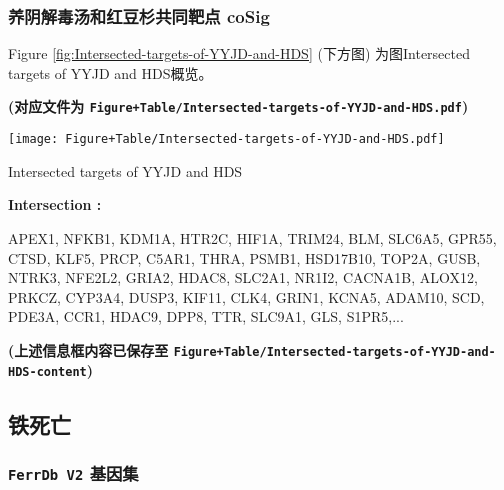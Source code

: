 \documentclass[
]{article}
\begin{document}
\hypertarget{ux517bux9634ux89e3ux6bd2ux6c64ux548cux7ea2ux8c46ux6749ux5171ux540cux9776ux70b9-cosig}{%
\subsubsection{养阴解毒汤和红豆杉共同靶点 coSig}\label{ux517bux9634ux89e3ux6bd2ux6c64ux548cux7ea2ux8c46ux6749ux5171ux540cux9776ux70b9-cosig}}

Figure \ref{fig:Intersected-targets-of-YYJD-and-HDS} (下方图) 为图Intersected targets of YYJD and HDS概览。

\textbf{(对应文件为 \texttt{Figure+Table/Intersected-targets-of-YYJD-and-HDS.pdf})}

\def\@captype{figure}
\begin{center}
\texttt{[image: Figure+Table/Intersected-targets-of-YYJD-and-HDS.pdf]}
\caption{Intersected targets of YYJD and HDS}\label{fig:Intersected-targets-of-YYJD-and-HDS}
\end{center}
\begin{center}\begin{tcolorbox}[colback=gray!10, colframe=gray!50, width=0.9\linewidth, arc=1mm, boxrule=0.5pt]
\textbf{
Intersection
:}

\vspace{0.5em}

    APEX1, NFKB1, KDM1A, HTR2C, HIF1A, TRIM24, BLM, SLC6A5,
GPR55, CTSD, KLF5, PRCP, C5AR1, THRA, PSMB1, HSD17B10,
TOP2A, GUSB, NTRK3, NFE2L2, GRIA2, HDAC8, SLC2A1, NR1I2,
CACNA1B, ALOX12, PRKCZ, CYP3A4, DUSP3, KIF11, CLK4, GRIN1,
KCNA5, ADAM10, SCD, PDE3A, CCR1, HDAC9, DPP8, TTR, SLC9A1,
GLS, S1PR5,...

\vspace{2em}
\end{tcolorbox}
\end{center}

\textbf{(上述信息框内容已保存至 \texttt{Figure+Table/Intersected-targets-of-YYJD-and-HDS-content})}

\hypertarget{ux94c1ux6b7bux4ea1}{%
\subsection{铁死亡}\label{ux94c1ux6b7bux4ea1}}

\hypertarget{ferrdb-v2-ux57faux56e0ux96c6}{%
\subsubsection{\texorpdfstring{\texttt{FerrDb\ V2} 基因集}{FerrDb V2 基因集}}\label{ferrdb-v2-ux57faux56e0ux96c6}}
\end{document}
